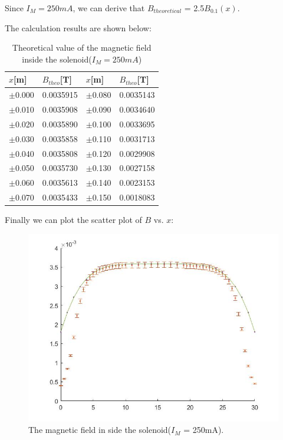 \documentclass[12pt, a4paper]{article}
\begin{document}
Since $I_M = 250mA$, we can derive that $B_{theoretical}$ = 2.5$B_{0.1}(x)$.

The calculation results are shown below:
\begin{table}[H]
	\begin{center}
	\begin{tabular}{|l|l|l|l|}
	\hline
	$x${[}m{]} & $B_{theo}${[}T{]} & $x${[}m{]} & $B_{theo}${[}T{]} \\ \hline
	$\pm$0.000 & 0.0035915         & $\pm$0.080 & 0.0035143         \\ \hline
	$\pm$0.010 & 0.0035908         & $\pm$0.090 & 0.0034640         \\ \hline
	$\pm$0.020 & 0.0035890         & $\pm$0.100 & 0.0033695         \\ \hline
	$\pm$0.030 & 0.0035858         & $\pm$0.110 & 0.0031713         \\ \hline
	$\pm$0.040 & 0.0035808         & $\pm$0.120 & 0.0029908         \\ \hline
	$\pm$0.050 & 0.0035730         & $\pm$0.130 & 0.0027158         \\ \hline
	$\pm$0.060 & 0.0035613         & $\pm$0.140 & 0.0023153         \\ \hline
	$\pm$0.070 & 0.0035433         & $\pm$0.150 & 0.0018083         \\ \hline
	\end{tabular}
	\caption{Theoretical value of the magnetic field inside the solenoid($I_M = 250mA$)}
	\end{center}
\end{table}

Finally we can plot the scatter plot of $B$ vs. $x$:
\begin{figure}[H]
	\centering
	\includegraphics[scale = 0.4]{plot3.jpg}
	\caption{The magnetic field in side the solenoid($I_M$ = 250mA).}
\end{figure}
\end{document}

